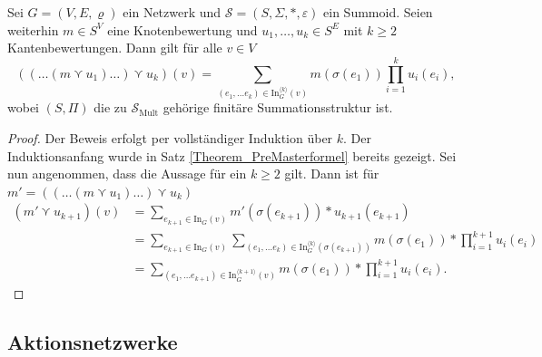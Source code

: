 \documentclass{article}
\begin{document}
\begin{theorem}\label{Theorem_Masterformel}
  Sei $G = (V, E, \varrho)$ ein Netzwerk und 
  $\mathcal{S} = (S, \Sigma, \ast, \varepsilon)$ ein Summoid.
  Seien weiterhin $m \in S^V$ eine Knotenbewertung und $u_1, \dots, u_k \in S^E$ mit $k \geq 2$ Kantenbewertungen.
  Dann gilt für alle $v \in V$
  \begin{equation*}
    ((\dots (m \curlyvee u_1) \dots) \curlyvee u_k)(v) = \sum_{(e_1, \dots e_k) \in \text{In}_G^{\langle k \rangle}(v)}m(\sigma(e_1)) \prod_{i = 1}^k u_i(e_i),
  \end{equation*}
  wobei $(S, \Pi)$ die zu $\mathcal{S}_\text{Mult}$ gehörige finitäre Summationsstruktur ist.
\end{theorem}
\begin{proof}
  Der Beweis erfolgt per vollständiger Induktion über $k$.
  Der Induktionsanfang wurde in Satz \ref{Theorem_PreMasterformel} bereits gezeigt.
  Sei nun angenommen, dass die Aussage für ein $k \geq 2$ gilt.
  Dann ist für $m' = ((\dots (m \curlyvee u_1) \dots) \curlyvee u_k)$
  \begin{align*}
    (m' \curlyvee u_{k + 1})(v)
    &= \sum_{e_{k+1} \in \text{In}_G(v)} m' (\sigma(e_{k+1})) \ast u_{k+1}(e_{k+1}) \\
    &= \sum_{e_{k+1} \in \text{In}_G(v)} \sum_{(e_1, \dots e_k) \in \text{In}_G^{\langle k \rangle}(\sigma(e_{k+1}))}m(\sigma(e_1)) \ast \prod_{i = 1}^{k+1} u_i(e_i) \\
    &= \sum_{(e_1, \dots e_{k+1}) \in \text{In}_G^{\langle k + 1 \rangle}(v)}m(\sigma(e_1)) \ast \prod_{i = 1}^{k+1} u_i(e_i).
  \end{align*}
\end{proof}

\subsection{Aktionsnetzwerke}
\end{document}
